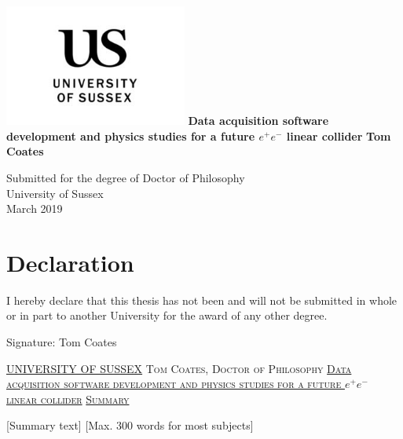 \documentclass[a4paper,11pt]{report}
\newcommand{\linespacing}{1.5}
\renewcommand{\baselinestretch}{\linespacing}
\begin{document}


\thispagestyle{empty}
\begin{center}
\includegraphics[width=6cm]{uslogonew}
\vskip40mm
\huge\textbf{Data acquisition software development and physics studies for a future $e^+e^-$ linear collider}
\vskip5mm
\Large\textbf{Tom Coates}
\normalsize
\end{center}
\vfill
\begin{flushleft}
\large
Submitted for the degree of Doctor of Philosophy \\
University of Sussex	\\
March 2019
\end{flushleft}		

\chapter*{Declaration}
I hereby declare that this thesis has not been and will not be submitted in whole or in part to another University for the award of any other degree.
	

\vskip5mm
Signature:
\vskip20mm
Tom Coates

\thispagestyle{empty}
\newpage
\null\vskip10mm
\begin{center}
\large
\underline{UNIVERSITY OF SUSSEX}
\vskip20mm
\textsc{Tom Coates, Doctor of Philosophy}
\vskip20mm
\underline{\textsc{Data acquisition software development and \hfill \break physics studies for a future $e^+e^-$ linear collider}}
\vskip0mm
\vskip20mm
\underline{\textsc{Summary}}
\vskip2mm
\end{center}
\renewcommand{\baselinestretch}{1.0}
\small\normalsize
[Summary text] [Max. 300 words for most subjects]
\end{document}
